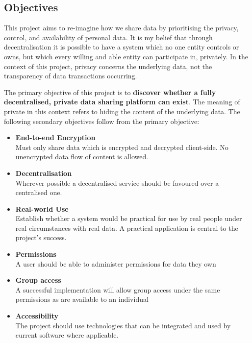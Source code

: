 \subsection{Objectives}

This project aims to re-imagine how we share data by prioritising the privacy, control, and availability of personal data. It is my belief that through decentralisation it is possible to have a system which no one entity controls or owns, but which every willing and able entity can participate in, privately. In the context of this project, privacy concerns the underlying data, not the transparency of data transactions occurring.

The primary objective of this project is to \textbf{discover whether a fully decentralised, private data sharing platform can exist}. The meaning of private in this context refers to hiding the content of the underlying data. The following secondary objectives follow from the primary objective:

\begin{itemize}
  \item \textbf{End-to-end Encryption} \\
  Must only share data which is encrypted and decrypted client-side. No unencrypted data flow of content is allowed.
  \item \textbf{Decentralisation} \\
  Wherever possible a decentralised service should be favoured over a centralised one.
  \item \textbf{Real-world Use} \\
  Establish whether a system would be practical for use by real people under real circumstances with real data. A practical application is central to the project's success.
  \item \textbf{Permissions} \\
  A user should be able to administer permissions for data they own
  \item \textbf{Group access} \\
  A successful implementation will allow group access under the same permissions as are available to an individual
  \item \textbf{Accessibility} \\
  The project should use technologies that can be integrated and used by current software where applicable.
\end{itemize}
